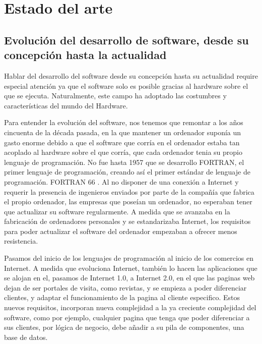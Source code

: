 \documentclass[12pt]{report} %
\begin{document}
	












\clearpage
{} %

\chapter{Estado del arte}

\section{Evolución del desarrollo de software, desde su concepción hasta la actualidad}

Hablar del desarrollo del software desde su concepción hasta su actualidad require especial atención ya que el software solo es posible gracias al hardware sobre el que se ejecuta.
Naturalmente, este campo ha adoptado las costumbres y características del mundo del Hardware.

Para entender la evolución del software, nos tenemos que remontar a los años cincuenta de la década pasada, en la que mantener un ordenador suponía un gasto enorme debido a que el software que corría en el ordenador estaba tan acoplado al hardware sobre el que corría, que cada ordenador tenia su propio lenguaje de programación. 
No fue hasta 1957 que se desarrollo FORTRAN, el primer lenguaje de programación, creando así el primer estándar de lenguaje de programación. FORTRAN 66 \cite{FORTRAN1966}.
Al no disponer de una conexión a Internet y requerir la presencia de ingenieros enviados por parte de la compañía que fabrica el propio ordenador, las empresas que poseían un ordenador, no esperaban tener que actualizar su software regularmente.
A medida que se avanzaba en la fabricación de ordenadores personales y se estandarizaba Internet, los requisitos para poder actualizar el software del ordenador empezaban a ofrecer menos resistencia.

Pasamos del inicio de los lenguajes de programación al inicio de los comercios en Internet.
A medida que evoluciona Internet, también lo hacen las aplicaciones que se alojan en el, pasamos de Internet 1.0, a  Internet 2.0, en el que las paginas web dejan de ser portales de visita, como revistas, y se empieza a poder diferenciar clientes, y adaptar el funcionamiento de la pagina al cliente especifico.
Estos nuevos requisitos, incorporan nueva complejidad a la ya creciente complejidad del software, como por ejemplo, cualquier pagina que tenga que poder diferenciar a sus clientes, por lógica de negocio, debe añadir a su pila de componentes, una base de datos.
\end{document}
